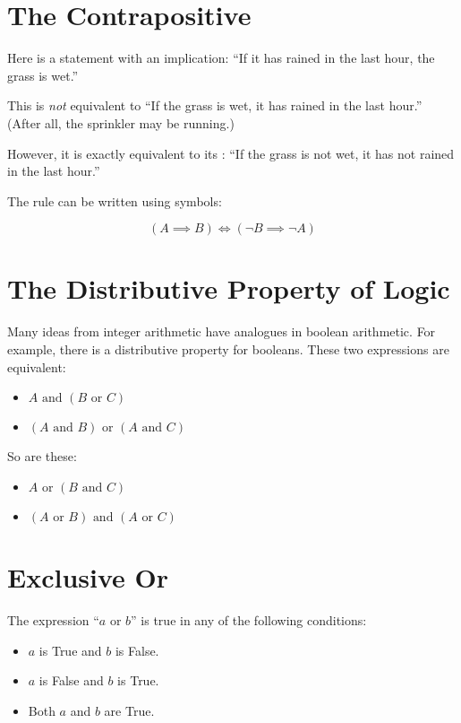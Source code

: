 \section{The Contrapositive}

Here is a statement with an implication: ``If it has rained in the last hour, the grass is wet.''

This is \textit{not} equivalent to ``If the grass is wet, it has
rained in the last hour.'' (After all, the sprinkler may be running.)

However, it is exactly equivalent to its :
``If the grass is not wet, it has not rained in the last hour.'' 

The rule can be written using symbols:

$$\left( A \implies B \right) \iff \left( \neg B \implies \neg A \right)$$

\section{The Distributive Property of Logic}

Many ideas from integer arithmetic have analogues in boolean
arithmetic. For example, there is a distributive property for booleans.  These two expressions are equivalent:
\begin{itemize}
  \item $A \text{ and } \left(B \text{ or } C \right)$
  \item $\left(A \text{ and } B \right) \text{ or } \left( A \text{ and } C \right)$
\end{itemize}

So are these:

\begin{itemize}
  \item $A \text{ or } \left(B \text{ and } C \right)$
  \item $\left(A \text{ or } B \right) \text{ and } \left( A \text{ or } C \right)$
\end{itemize}


\section{Exclusive Or}

The expression ``$a \text{ or } b$'' is true in any of the following conditions:
\begin{itemize}
\item $a$ is True and $b$ is False.
\item $a$ is False and $b$ is True.
\item Both $a$ and $b$ are True.
\end{itemize}

